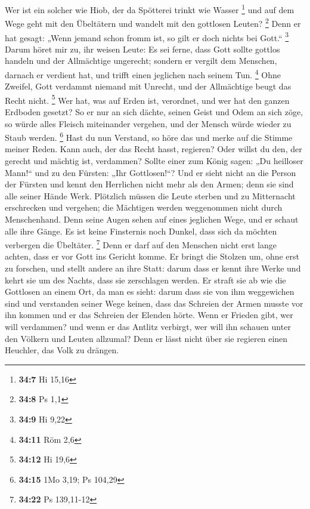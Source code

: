  Wer ist ein solcher wie Hiob, der da Spötterei trinkt wie
Wasser \footnote{\textbf{34:7} Hi 15,16}  und auf dem Wege
geht mit den Übeltätern und wandelt mit den gottlosen Leuten?
\footnote{\textbf{34:8} Ps 1,1}  Denn er hat gesagt: „Wenn
jemand schon fromm ist, so gilt er doch nichts bei Gott.`` \footnote{\textbf{34:9}
  Hi 9,22}  Darum höret mir zu, ihr weisen Leute: Es sei
ferne, dass Gott sollte gottlos handeln und der Allmächtige ungerecht;
 sondern er vergilt dem Menschen, darnach er verdient
hat, und trifft einen jeglichen nach seinem Tun. \footnote{\textbf{34:11}
  Röm 2,6}  Ohne Zweifel, Gott verdammt niemand mit
Unrecht, und der Allmächtige beugt das Recht nicht. \footnote{\textbf{34:12}
  Hi 19,6}  Wer hat, was auf Erden ist, verordnet, und
wer hat den ganzen Erdboden gesetzt?  So er nur an sich
dächte, seinen Geist und Odem an sich zöge,  so würde
alles Fleisch miteinander vergehen, und der Mensch würde wieder zu Staub
werden. \footnote{\textbf{34:15} 1Mo 3,19; Ps 104,29} 
Hast du nun Verstand, so höre das und merke auf die Stimme meiner Reden.
 Kann auch, der das Recht hasst, regieren? Oder willst du
den, der gerecht und mächtig ist, verdammen?  Sollte
einer zum König sagen: „Du heilloser Mann!{}`` und zu den Fürsten: „Ihr
Gottlosen!{}``?  Und er sieht nicht an die Person der
Fürsten und kennt den Herrlichen nicht mehr als den Armen; denn sie sind
alle seiner Hände Werk.  Plötzlich müssen die Leute
sterben und zu Mitternacht erschrecken und vergehen; die Mächtigen
werden weggenommen nicht durch Menschenhand.  Denn seine
Augen sehen auf eines jeglichen Wege, und er schaut alle ihre Gänge.
 Es ist keine Finsternis noch Dunkel, dass sich da
möchten verbergen die Übeltäter. \footnote{\textbf{34:22} Ps 139,11-12}
 Denn er darf auf den Menschen nicht erst lange achten,
dass er vor Gott ins Gericht komme.  Er bringt die
Stolzen um, ohne erst zu forschen, und stellt andere an ihre Statt:
 darum dass er kennt ihre Werke und kehrt sie um des
Nachts, dass sie zerschlagen werden.  Er straft sie ab
wie die Gottlosen an einem Ort, da man es sieht:  darum
dass sie von ihm weggewichen sind und verstanden seiner Wege keinen,
 dass das Schreien der Armen musste vor ihn kommen und er
das Schreien der Elenden hörte.  Wenn er Frieden gibt,
wer will verdammen? und wenn er das Antlitz verbirgt, wer will ihn
schauen unter den Völkern und Leuten allzumal?  Denn er
lässt nicht über sie regieren einen Heuchler, das Volk zu drängen.

